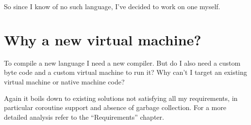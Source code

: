 	So since I know of no such language, I've decided to work on one myself.
	
	\section{Why a new virtual machine?}
	
	To compile a new language I need a new compiler. But do I also need a custom byte code and a custom virtual machine to run it? Why can't I target an existing virtual machine or native machine code?
	
	Again it boils down to existing solutions not satisfying all my requirements, in particular coroutine support and absence of garbage collection. For a more detailed analysis refer to the ``Requirements'' chapter.
	

